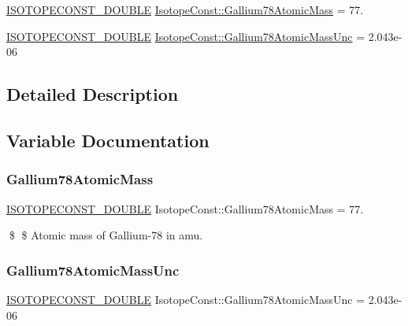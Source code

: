 \begin{DoxyCompactItemize}
\item 
\mbox{\hyperlink{group___isotope_const-_macros_ga8f45a7272ce02c0b4c65c44636ed719a}{I\+S\+O\+T\+O\+P\+E\+C\+O\+N\+S\+T\+\_\+\+D\+O\+U\+B\+LE}} \mbox{\hyperlink{group___isotope_const-_gallium-_ga78_gad3b6c3a4df1e1f8fee20224b0fc99fdf}{Isotope\+Const\+::\+Gallium78\+Atomic\+Mass}} = 77.
\item 
\mbox{\hyperlink{group___isotope_const-_macros_ga8f45a7272ce02c0b4c65c44636ed719a}{I\+S\+O\+T\+O\+P\+E\+C\+O\+N\+S\+T\+\_\+\+D\+O\+U\+B\+LE}} \mbox{\hyperlink{group___isotope_const-_gallium-_ga78_ga2f2376765a2b6d2d8b61c8f1dd58c28b}{Isotope\+Const\+::\+Gallium78\+Atomic\+Mass\+Unc}} = 2.\+043e-\/06
\end{DoxyCompactItemize}


\subsection{Detailed Description}


\subsection{Variable Documentation}
\mbox{\label{group___isotope_const-_gallium-_ga78_gad3b6c3a4df1e1f8fee20224b0fc99fdf}} 
\subsubsection{\texorpdfstring{Gallium78\+Atomic\+Mass}{Gallium78AtomicMass}}
{\footnotesize\ttfamily \mbox{\hyperlink{group___isotope_const-_macros_ga8f45a7272ce02c0b4c65c44636ed719a}{I\+S\+O\+T\+O\+P\+E\+C\+O\+N\+S\+T\+\_\+\+D\+O\+U\+B\+LE}} Isotope\+Const\+::\+Gallium78\+Atomic\+Mass = 77.}

\$ \$ Atomic mass of Gallium-\/78 in amu. \mbox{\label{group___isotope_const-_gallium-_ga78_ga2f2376765a2b6d2d8b61c8f1dd58c28b}} 
\subsubsection{\texorpdfstring{Gallium78\+Atomic\+Mass\+Unc}{Gallium78AtomicMassUnc}}
{\footnotesize\ttfamily \mbox{\hyperlink{group___isotope_const-_macros_ga8f45a7272ce02c0b4c65c44636ed719a}{I\+S\+O\+T\+O\+P\+E\+C\+O\+N\+S\+T\+\_\+\+D\+O\+U\+B\+LE}} Isotope\+Const\+::\+Gallium78\+Atomic\+Mass\+Unc = 2.\+043e-\/06}

